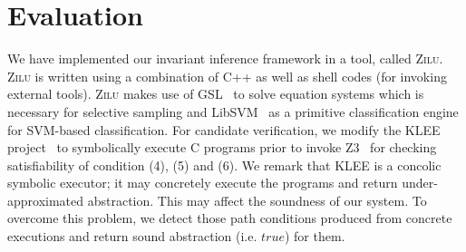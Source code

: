 
\section{Evaluation} %
\label{sec:evaluations}
We have implemented our invariant inference framework in a tool, called \textsc{Zilu}. \textsc{Zilu} is written using a combination of C++ as well as shell codes (for invoking external tools).
\textsc{Zilu} makes use of GSL~\cite{gough2009gnu} to solve equation systems which is necessary for selective sampling and
 LibSVM~\cite{chang2011libsvm} as a primitive classification engine for
SVM-based classification. %
For candidate verification, we %
modify the KLEE project~\cite{cadar2008klee} to
symbolically execute
 C programs %
prior to invoke Z3~\cite{de2008z3} for checking satisfiability of
condition (4), (5) and (6).
 We remark that KLEE is a concolic symbolic executor; it may
concretely execute the programs and return
 under-approximated
abstraction. This may affect the soundness of our system.
To overcome this problem, we detect those path conditions produced from
concrete executions
and return sound abstraction (i.e. $true$) for them.


